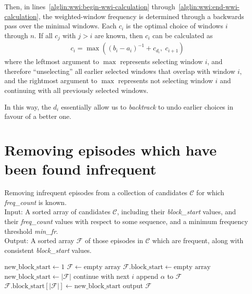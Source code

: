 Then, in lines~\ref{alglin:wwi:begin-wwi-calculation} through~\ref{alglin:wwi:end-wwi-calculation}, the weighted-window frequency is determined through a backwards pass over the minimal windows. Each $ c_i $ is the optimal choice of windows $ i $ through $ n $. If all $ c_j $ with $ j > i $ are known, then $ c_i $ can be calculated as
\begin{align*}
c_i = \max((b_i - a_i)^{-1} + c_{d_i}, \; c_{i+1})
\end{align*}
where the leftmost argument to $ \max $ represents selecting window $ i $, and therefore ``unselecting'' all earlier selected windows that overlap with window $ i $, and the rightmost argument to $ \max $ represents not selecting window $ i $ and continuing with all previously selected windows.

In this way, the $ d_i $ essentially allow us to \emph{backtrack} to undo earlier choices in favour of a better one.



\section{Removing episodes which have been found infrequent}
\label{sec:maintain-blocks}

\begin{algorithm}

\caption{Removing infrequent episodes from a collection of candidates $ \mathcal{C} $ for which \emph{freq\_count} is known. \\
Input: A sorted array of candidates $ \mathcal{C} $, including their \emph{block\_start} values, and their \emph{freq\_count} values with respect to some sequence, and a minimum frequency threshold \emph{min\_fr}. \\
Output: A sorted array $ \mathcal{F} $ of those episodes in $ \mathcal{C} $ which are frequent, along with consistent \emph{block\_start} values.
}

\begin{algorithmic}[1]

\State $ \text{new\_block\_start} \gets 1 $
\State $ \mathcal{F} \gets \text{empty array} $
\State $ \mathcal{F} \text{.block\_start} \gets \text{empty array} $
     \label{alglin:remove-infrequent-episodes:different-block-test}
        \State $ \text{new\_block\_start} \gets | \mathcal{F} | $
    \EndIf
        \State continue with next $ i $
    \EndIf
    \State append $ \alpha $ to $ \mathcal{F} $
    \State $ \mathcal{F} \text{.block\_start}[ | \mathcal{F} | ] \gets \text{new\_block\_start} $
\EndFor
\State output $ \mathcal{F} $

\end{algorithmic}

\label{alg:remove-infrequent-episodes}
\end{algorithm}

